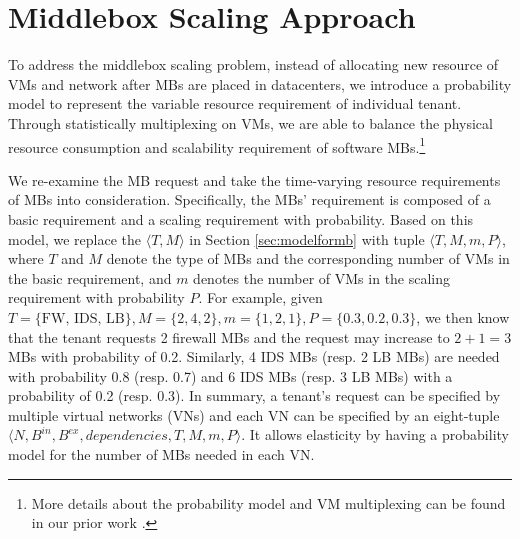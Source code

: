 \documentclass[review]{elsarticle}
\begin{document}
\section{Middlebox Scaling Approach}\label{sec:scalability}
To address the middlebox scaling problem, instead of allocating new resource of VMs and network after MBs are placed in datacenters, we introduce a probability model to represent the variable resource requirement of individual tenant. Through statistically multiplexing on VMs, we are able to balance the physical resource consumption and scalability requirement of software MBs.\footnote{More details about the probability model and VM multiplexing can be found in our prior work \cite{zhang2016burstiness}.} 

We re-examine the MB request and take the time-varying resource requirements of MBs into consideration. Specifically, the MBs' requirement is composed of a basic requirement and a scaling requirement with probability. Based on this model, we replace the $\langle T, M \rangle$ in Section \ref{sec:modelformb} with tuple $\langle T, M, m, P\rangle$, where $T$ and $M$  denote the type of MBs and the corresponding number of VMs in the basic requirement, and $m$ denotes the number of VMs in the scaling requirement with probability $P$. For example, given $T=\{\text{FW, IDS, LB}\}, M=\{ 2, 4, 2\}, m=\{1, 2, 1\}, P=\{0.3, 0.2, 0.3\}$, we then know that the tenant requests 2 firewall MBs and the request may increase to $2+1=3$ MBs with probability of 0.2. Similarly, 4 IDS MBs (resp. 2 LB MBs) are needed with probability 0.8 (resp. 0.7) and 6 IDS MBs (resp. 3 LB MBs) with a probability of 0.2 (resp. 0.3). In summary, a tenant's request can be specified by multiple virtual networks (VNs) and each VN can be specified by an eight-tuple $\langle N, B^{in}, B^{ex}, dependencies, T, M, m, P\rangle$. It allows elasticity by having a probability model for the number of MBs needed in each VN. 
\end{document}
